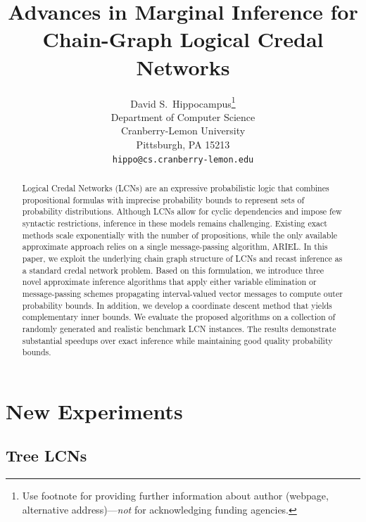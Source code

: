 \documentclass{article}
\title{Advances in Marginal Inference for\\Chain-Graph Logical Credal Networks}
\author{%
  David S.~Hippocampus\thanks{Use footnote for providing further information
    about author (webpage, alternative address)---\emph{not} for acknowledging
    funding agencies.} \\
  Department of Computer Science\\
  Cranberry-Lemon University\\
  Pittsburgh, PA 15213 \\
  \texttt{hippo@cs.cranberry-lemon.edu} \\
}
\begin{document}


\maketitle


\begin{abstract}
    Logical Credal Networks (LCNs) are an expressive probabilistic logic that combines propositional formulas with imprecise probability bounds to represent sets of probability distributions. Although LCNs allow for cyclic dependencies and impose few syntactic restrictions, inference in these models remains challenging. Existing exact methods scale exponentially with the number of propositions, while the only available approximate approach relies on a single message-passing algorithm, ARIEL. In this paper, we exploit the underlying chain graph structure of LCNs and recast inference as a standard credal network problem. Based on this formulation, we introduce three novel approximate inference algorithms that apply either variable elimination or message-passing schemes propagating interval-valued vector messages to compute outer probability bounds. In addition, we develop a coordinate descent method that yields complementary inner bounds. We evaluate the proposed algorithms on a collection of randomly generated and realistic benchmark LCN instances. The results demonstrate substantial speedups over exact inference while maintaining good quality probability bounds.
\end{abstract}


\section{New Experiments}
\label{sec-experiments}

\subsection{Tree LCNs}
\end{document}
